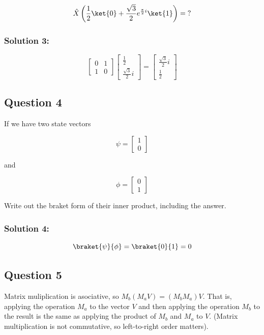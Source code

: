 \documentclass{article}
\begin{document}
$$
\hat{X}\left(\frac{1}{2}\ket{0}+\frac{\sqrt{3}}{2}e^{\frac{\pi}{2}i}\ket{1} \right)=\mathbf{?}
$$

\subsubsection*{Solution 3:}

\[\begin{bmatrix}0&1\\1&0\end{bmatrix}\begin{bmatrix}\frac12\\\frac{\sqrt3}{2}i\end{bmatrix}=\begin{bmatrix}\frac{\sqrt3}{2}i\\\frac12\end{bmatrix}\]

\subsection*{Question 4}

If we have two state vectors

$$
\psi =
\begin{bmatrix}
    1 \\
    0
\end{bmatrix}$$

and

$$
\phi =
\begin{bmatrix}
    0 \\
    1
\end{bmatrix}$$

Write out the braket form of their inner product, including the answer.

\subsubsection*{Solution 4:}

\[\braket{\psi}{\phi}=\braket{0}{1}=0\]


\subsection*{Question 5}

Matrix muliplication is asociative, so $M_b (M_a V) = (M_b M_a)V$. That is, applying the operation $M_a$ to the vector $V$ and then applying the operation $M_b$ to the result is the same as applying the product of $M_b$ and $M_a$ to $V$. (Matrix multiplication is not commutative, so left-to-right order matters).
\end{document}

